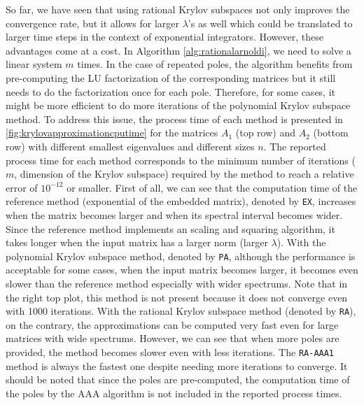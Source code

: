 So far, we have seen that using rational Krylov subspaces not only improves the convergence rate,
but it allows for larger $\lambda$'s as well which could be translated to larger time steps in
the context of exponential integrators.
However, these advantages come at a cost. In Algorithm \ref{alg:rationalarnoldi}, we need to
solve a linear system $m$ times. In the case of repeated poles, the algorithm benefits from pre-computing
the LU factorization of the corresponding matrices but it still needs to do the factorization
once for each pole. Therefore, for some cases, it might be more efficient to do more iterations
of the polynomial Krylov subspace method.
To address this issue, the process time of each method is presented in
\autoref{fig:krylovapproximationcputime} for the matrices $A_1$ (top row) and $A_2$
(bottom row) with different smallest eigenvalues and different sizes $n$.
The reported process time for each method corresponds to the minimum number of
iterations ($m$, dimension of the Krylov subspace) required by the method to reach
a relative error of $10^{-12}$ or smaller.
First of all, we can see that the computation time of the reference method (exponential of the
embedded matrix), denoted by \texttt{EX}, increases when the matrix becomes larger and when
its spectral interval becomes wider. Since the reference method implements an scaling and squaring
algorithm, it takes longer when the input matrix has a larger norm (larger $\lambda$).
With the polynomial Krylov subspace method, denoted by \texttt{PA}, although the performance
is acceptable for some cases, when the input matrix becomes larger, it becomes even slower than
the reference method especially with wider spectrums. Note that in the right top plot,
this method is not present because it does not converge even with 1000 iterations.
With the rational Krylov subspace method (denoted by \texttt{RA}), on the contrary,
the approximations can be computed very fast even for large matrices with wide spectrums.
However, we can see that when more poles are provided, the method becomes slower even
with less iterations. The \texttt{RA-AAA1} method is always the fastest one despite
needing more iterations to converge.
It should be noted that since the poles are pre-computed, the computation time of
the poles by the AAA algorithm is not included in the reported process times.

